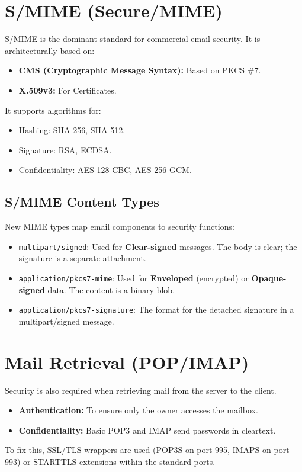 \section{S/MIME (Secure/MIME)}
S/MIME is the dominant standard for commercial email security. It is architecturally based on:
\begin{itemize}
    \item \textbf{CMS (Cryptographic Message Syntax):} Based on PKCS \#7.
    \item \textbf{X.509v3:} For Certificates.
\end{itemize}

It supports algorithms for:
\begin{itemize}
    \item Hashing: SHA-256, SHA-512.
    \item Signature: RSA, ECDSA.
    \item Confidentiality: AES-128-CBC, AES-256-GCM.
\end{itemize}

\subsection{S/MIME Content Types}
New MIME types map email components to security functions:
\begin{itemize}
    \item \texttt{multipart/signed}: Used for \textbf{Clear-signed} messages. The body is clear; the signature is a separate attachment.
    \item \texttt{application/pkcs7-mime}: Used for \textbf{Enveloped} (encrypted) or \textbf{Opaque-signed} data. The content is a binary blob.
    \item \texttt{application/pkcs7-signature}: The format for the detached signature in a multipart/signed message.
\end{itemize}

\section{Mail Retrieval (POP/IMAP)}
Security is also required when retrieving mail from the server to the client.
\begin{itemize}
    \item \textbf{Authentication:} To ensure only the owner accesses the mailbox.
    \item \textbf{Confidentiality:} Basic POP3 and IMAP send passwords in cleartext.
\end{itemize}
To fix this, SSL/TLS wrappers are used (POP3S on port 995, IMAPS on port 993) or STARTTLS extensions within the standard ports.
